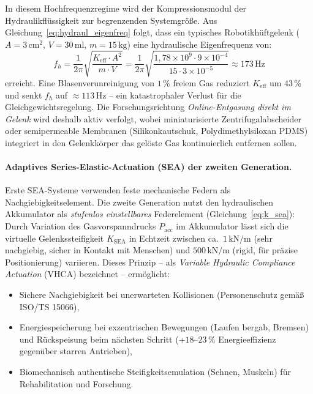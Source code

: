 ﻿\documentclass[a4paper,12pt]{scrreprt}
\theoremstyle{definition}
\begin{document}
In diesem Hochfrequenzregime wird der Kompressionsmodul der Hydraulik\-flüssigkeit
zur begrenzenden Systemgröße. Aus Gleichung~\eqref{eq:hydraul_eigenfreq}
folgt, dass ein typisches Robotikhüftgelenk ($A = 3\,\mathrm{cm}^2$,
$V = 30\,\mathrm{ml}$, $m = 15\,\mathrm{kg}$) eine hydraulische
Eigenfrequenz von:
\begin{equation}
  f_h = \frac{1}{2\pi}\sqrt{\frac{K_{\mathrm{eff}} \cdot A^2}{m \cdot V}}
      = \frac{1}{2\pi}\sqrt{\frac{1{,}78 \times 10^9 \cdot 9 \times 10^{-4}}
        {15 \cdot 3 \times 10^{-5}}}
      \approx 173\,\mathrm{Hz}
  \label{eq:robotik_hueftgelenk}
\end{equation}
erreicht. Eine Blasenverunreinigung von $1\,\%$ freiem Gas reduziert
$K_{\mathrm{eff}}$ um $43\,\%$ und senkt $f_h$ auf $\approx 113\,\mathrm{Hz}$
-- ein katastrophaler Verlust für die Gleichgewichtsregelung. Die
Forschungsrichtung \emph{Online-Entgasung direkt im Gelenk} wird
deshalb aktiv verfolgt, wobei miniaturisierte Zentrifugalabscheider
oder semi\-permeable Membranen (Silikonkautschuk, Polydimethylsiloxan
PDMS) integriert in den Gelenkkörper das gelöste Gas kontinuierlich
entfernen sollen.

\paragraph{Adaptives Series-Elastic-Actuation (SEA) der zweiten Generation.}
Erste SEA-Systeme verwenden feste mechanische Federn als Nachgiebigkeits\-element.
Die zweite Generation nutzt den hydraulischen Akkumulator als
\emph{stufenlos einstellbares} Federelement (Gleichung~\eqref{eq:k_sea}):
Durch Variation des Gasvorspanndrucks $P_{\mathrm{acc}}$ im Akkumulator
lässt sich die virtuelle Gelenks\-steifigkeit $K_{\mathrm{SEA}}$ in Echtzeit
zwischen ca.\ $1\,\mathrm{kN/m}$ (sehr nachgiebig, sicher in
Kontakt mit Menschen) und $500\,\mathrm{kN/m}$ (rigid, für präzise
Positionierung) variieren. Dieses Prinzip -- als \emph{Variable Hydraulic
Compliance Actuation} (VHCA) bezeichnet -- ermöglicht:
\begin{itemize}
  \item Sichere Nachgiebigkeit bei unerwarteten Kollisionen
    (Personenschutz gemäß ISO/TS 15066),
  \item Energiespeicherung bei exzentrischen Bewegungen (Laufen bergab,
    Bremsen) und Rückspeisung beim nächsten Schritt (+$18$--$23\,\%$
    Energieeffizienz gegenüber starren Antrieben),
  \item Biomechanisch authentische Steifigkeitsemulation (Sehnen,
    Muskeln) für Rehabilitation und Forschung.
\end{itemize}
\end{document}
